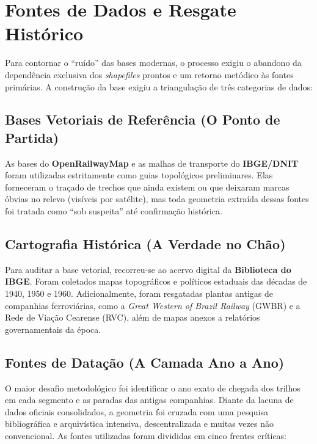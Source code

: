 \documentclass[11pt, a4paper]{article}
\begin{document}
\section{Fontes de Dados e Resgate Histórico}

Para contornar o ``ruído'' das bases modernas, o processo exigiu o abandono da dependência exclusiva dos \textit{shapefiles} prontos e um retorno metódico às fontes primárias. A construção da base exigiu a triangulação de três categorias de dados:

\subsection{Bases Vetoriais de Referência (O Ponto de Partida)}
As bases do \textbf{OpenRailwayMap} e as malhas de transporte do \textbf{IBGE/DNIT} foram utilizadas estritamente como guias topológicos preliminares. Elas forneceram o traçado de trechos que ainda existem ou que deixaram marcas óbvias no relevo (visíveis por satélite), mas toda geometria extraída dessas fontes foi tratada como ``sob suspeita'' até confirmação histórica.

\subsection{Cartografia Histórica (A Verdade no Chão)}
Para auditar a base vetorial, recorreu-se ao acervo digital da \textbf{Biblioteca do IBGE}. Foram coletados mapas topográficos e políticos estaduais das décadas de 1940, 1950 e 1960. Adicionalmente, foram resgatadas plantas antigas de companhias ferroviárias, como a \textit{Great Western of Brazil Railway} (GWBR) e a Rede de Viação Cearense (RVC), além de mapas anexos a relatórios governamentais da época.

\subsection{Fontes de Datação (A Camada Ano a Ano)}
O maior desafio metodológico foi identificar o ano exato de chegada dos trilhos em cada segmento e as paradas das antigas companhias. Diante da lacuna de dados oficiais consolidados, a geometria foi cruzada com uma pesquisa bibliográfica e arquivística intensiva, descentralizada e muitas vezes não convencional. As fontes utilizadas foram divididas em cinco frentes críticas:
\end{document}
